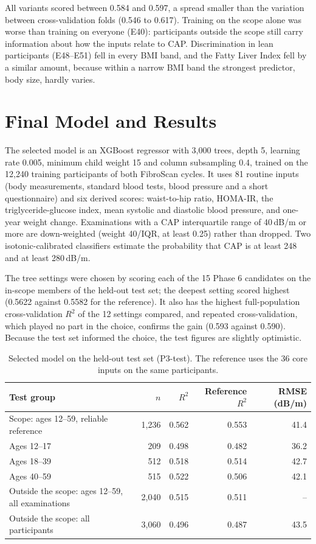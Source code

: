 All variants scored between 0.584 and 0.597, a spread smaller than the variation between cross-validation folds (0.546 to 0.617). Training on the scope alone was worse than training on everyone (E40): participants outside the scope still carry information about how the inputs relate to CAP. Discrimination in lean participants (E48--E51) fell in every BMI band, and the Fatty Liver Index fell by a similar amount, because within a narrow BMI band the strongest predictor, body size, hardly varies.

\section{Final Model and Results}
\label{sec:exp-final}

The selected model is an XGBoost regressor \cite{chen2016xgboost} with 3,000 trees, depth 5, learning rate 0.005, minimum child weight 15 and column subsampling 0.4, trained on the 12,240 training participants of both FibroScan cycles. It uses 81 routine inputs (body measurements, standard blood tests, blood pressure and a short questionnaire) and six derived scores: waist-to-hip ratio, HOMA-IR, the triglyceride-glucose index, mean systolic and diastolic blood pressure, and one-year weight change. Examinations with a CAP interquartile range of 40\,dB/m or more are down-weighted (weight 40/IQR, at least 0.25) rather than dropped. Two isotonic-calibrated classifiers estimate the probability that CAP is at least 248 and at least 280\,dB/m.

The tree settings were chosen by scoring each of the 15 Phase 6 candidates on the in-scope members of the held-out test set; the deepest setting scored highest (0.5622 against 0.5582 for the reference). It also has the highest full-population cross-validation $R^2$ of the 12 settings compared, and repeated cross-validation, which played no part in the choice, confirms the gain (0.593 against 0.590). Because the test set informed the choice, the test figures are slightly optimistic.

\begin{table}[t]
\centering
\small
\caption{Selected model on the held-out test set (P3-test). The reference uses the 36 core inputs on the same participants.}
\label{tab:final-test}
\begin{tabular}{@{}l r r r r@{}}
\toprule
Test group & $n$ & $R^2$ & Reference $R^2$ & RMSE (dB/m) \\
\midrule
Scope: ages 12--59, reliable reference & 1,236 & 0.562 & 0.553 & 41.4 \\
\quad Ages 12--17 & 209 & 0.498 & 0.482 & 36.2 \\
\quad Ages 18--39 & 512 & 0.518 & 0.514 & 42.7 \\
\quad Ages 40--59 & 515 & 0.522 & 0.506 & 42.1 \\
Outside the scope: ages 12--59, all examinations & 2,040 & 0.515 & 0.511 & -- \\
Outside the scope: all participants & 3,060 & 0.496 & 0.487 & 43.5 \\
\bottomrule
\end{tabular}
\end{table}

